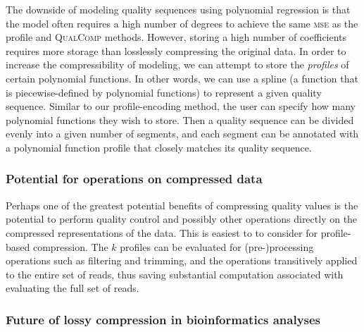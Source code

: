 The downside of modeling quality sequences using polynomial regression is that the model often requires a high number of degrees to achieve the same \textsc{mse} as the profile and \textsc{QualComp} methods.
However, storing a high number of coefficients requires more storage than losslessly compressing the original data.
In order to increase the compressibility of modeling, we can attempt to store the \emph{profiles} of certain polynomial functions.
In other words, we can use a spline (a function that is piecewise-defined by polynomial functions) to represent a given quality sequence.
Similar to our profile-encoding method, the user can specify how many polynomial functions they wish to store.
Then a quality sequence can be divided evenly into a given number of segments, and each segment can be annotated with a polynomial function profile that closely matches its quality sequence.

\subsubsection{Potential for operations on compressed data}

Perhaps one of the greatest potential benefits of compressing quality
values is the potential to perform quality control and possibly other
operations directly on the compressed representations of the
data. This is easiest to to consider for profile-based
compression. The $k$ profiles can be evaluated for (pre-)processing
operations such as filtering and trimming, and the operations
transitively applied to the entire set of reads, thus saving
substantial computation associated with evaluating the full set of
reads.

\subsubsection{Future of lossy compression in bioinformatics analyses}

